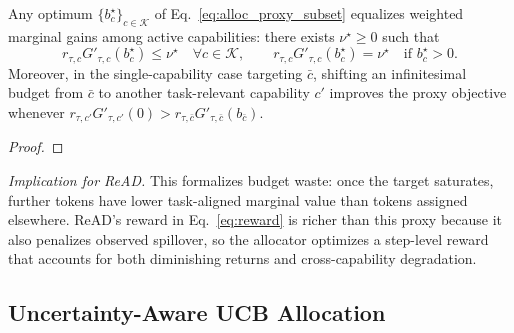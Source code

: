 \begin{proposition}
\label{prop:kkt}
Any optimum $\{b_c^\star\}_{c\in\mathcal{K}}$ of Eq.~\eqref{eq:alloc_proxy_subset} equalizes weighted marginal gains among active capabilities: there exists $\nu^\star\ge0$ such that
\begin{equation}
r_{\tau,c}G'_{\tau,c}(b_c^\star)\le\nu^\star
\quad\forall c\in\mathcal{K},
\qquad
r_{\tau,c}G'_{\tau,c}(b_c^\star)=\nu^\star
\quad\text{if } b_c^\star>0.
\label{eq:kkt_subset}
\end{equation}
Moreover, in the single-capability case targeting $\bar c$, shifting an infinitesimal budget from $\bar c$ to another task-relevant capability $c'$ improves the proxy objective whenever $r_{\tau,c'}G'_{\tau,c'}(0)
>
r_{\tau,\bar c}G'_{\tau,\bar c}(b_{\bar c})$.
\end{proposition}
\begin{proof}
\end{proof}

\noindent\textit{Implication for ReAD.}
This formalizes budget waste: once the target saturates, further tokens have
lower task-aligned marginal value than tokens assigned elsewhere. ReAD's reward
in Eq.~\eqref{eq:reward} is richer than this proxy because it also penalizes
observed spillover, so the allocator optimizes a step-level reward that
accounts for both diminishing returns and cross-capability degradation.

\subsection{Uncertainty-Aware UCB Allocation}
\label{subsec:theory_ucb_short}

